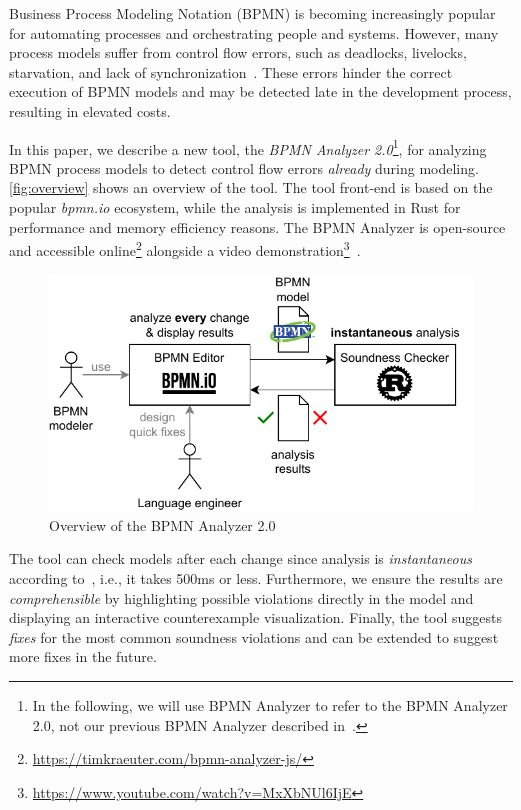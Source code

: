 \documentclass[
twocolumn
]{ceurart}
\begin{document}
Business Process Modeling Notation (BPMN) is becoming increasingly popular for automating processes and orchestrating people and systems.
However, many process models suffer from control flow errors, such as deadlocks, livelocks, starvation, and lack of synchronization~\cite{fahlandAnalysisDemandInstantaneous2011}.
These errors hinder the correct execution of BPMN models and may be detected late in the development process, resulting in elevated costs.

In this paper, we describe a new tool, the \textit{BPMN Analyzer 2.0}\footnote{
In the following, we will use BPMN Analyzer to refer to the BPMN Analyzer 2.0, not our previous BPMN Analyzer described in~\cite{krauterHigherorderTransformationApproach2024}.}, for analyzing BPMN process models to detect control flow errors \textit{already} during modeling. %
\autoref{fig:overview} shows an overview of the tool.
The tool front-end is based on the popular \textit{bpmn.io} ecosystem, while the analysis is implemented in Rust for performance and memory efficiency reasons.
The BPMN Analyzer is open-source and accessible online\footnote{\url{https://timkraeuter.com/bpmn-analyzer-js/}} alongside a video demonstration\footnote{\url{https://www.youtube.com/watch?v=MxXbNUl6IjE}}~\cite{krauterInstantaneousComprehensibleFixable2024}.

\begin{figure}[ht]
	\centering
	\includegraphics[width=1\linewidth]{images/overview}
	\caption{Overview of the BPMN Analyzer 2.0}
	\label{fig:overview}
\end{figure}

The tool can check models after each change since analysis is \textit{instantaneous} according to~\cite{fahlandAnalysisDemandInstantaneous2011}, i.e., it takes 500ms or less.
Furthermore, we ensure the results are \textit{comprehensible} by highlighting possible violations directly in the model and displaying an interactive counterexample visualization.
Finally, the tool suggests \textit{fixes} for the most common soundness violations and can be extended to suggest more fixes in the future.
\end{document}
